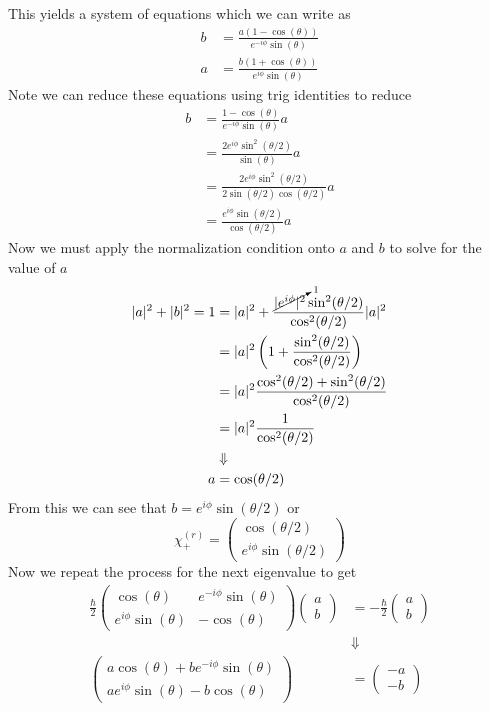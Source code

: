\documentclass[11pt]{article}
\numberwithin{equation}{section}
\begin{document}
This yields a system of equations which we can write as
\begin{align}
b &= \frac{a(1-\cos(\theta))}{e^{-i\phi}\sin(\theta)}\label{eq:1}\\
a &= \frac{b(1+\cos(\theta))}{e^{i\phi}\sin(\theta)}\label{eq:2}
\end{align}
Note we can reduce these equations using trig identities to reduce
\begin{align*}
b &= \frac{1-\cos(\theta)}{e^{-i\phi}\sin(\theta)}a\\
&= \frac{2e^{i\phi}\sin^2(\theta/2)}{\sin(\theta)}a\\
&= \frac{2e^{i\phi}\sin^2(\theta/2)}{2\sin(\theta/2)\cos(\theta/2)}a\\
&= \frac{e^{i\phi}\sin(\theta/2)}{\cos(\theta/2)}a
\end{align*}
Now we must apply the normalization condition onto $a$ and $b$ to solve for the value of $a$
\begin{align*}
|a|^2+|b|^2 = 1 &= |a|^2 + \frac{\cancelto{1}{|e^{i\phi}|^2}\sin^2(\theta/2)}{\cos^2(\theta/2)}|a|^2\\
&= |a|^2\left(1 + \frac{\sin^2(\theta/2)}{\cos^2(\theta/2)}\right)\\
&= |a|^2\frac{\cos^2(\theta/2)+\sin^2(\theta/2)}{\cos^2(\theta/2)}\\
&= |a|^2\frac{1}{\cos^2(\theta/2)}\\
&\Downarrow\\
a &= \cos(\theta/2)
\end{align*}
From this we can see that $b = e^{i\phi}\sin(\theta/2)$ or
$$\chi^{(r)}_+ = \left(\begin{array}{c}
                 \cos(\theta/2)\\
                 e^{i\phi}\sin(\theta/2)
\end{array}\right)$$
Now we repeat the process for the next eigenvalue to get
\begin{align*}
\frac{\hbar}{2}\left(\begin{array}{cc}
       \cos(\theta)    &e^{-i\phi}\sin(\theta)\\
       e^{i\phi}\sin(\theta) &-\cos(\theta)
      \end{array}\right)\left(\begin{array}{c}a\\ b\end{array}\right) &= -\frac{\hbar}{2}\left(\begin{array}{c}a\\ b\end{array}\right)\\
&\Downarrow\\
\left(\begin{array}{c}
       a\cos(\theta) + be^{-i\phi}\sin(\theta)\\
       ae^{i\phi}\sin(\theta) - b\cos(\theta)\end{array}\right)
      &= \left(\begin{array}{c}-a\\ -b\end{array}\right)
\end{align*}
\end{document}
